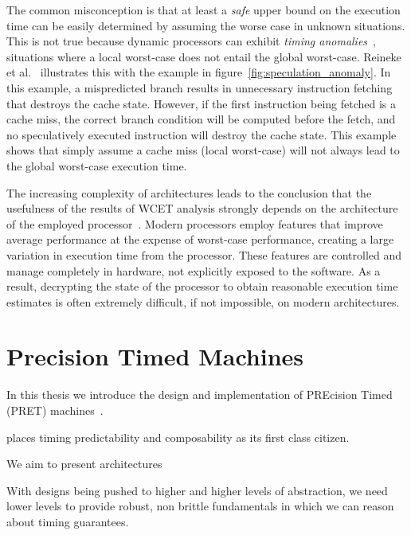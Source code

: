 The common misconception is that at least a \emph{safe} upper bound on the execution time can be easily determined by assuming the worse case in unknown situations.
This is not true because dynamic processors can exhibit \emph{timing anomalies}~\cite{Reineke06adefinition,Lundqvist1999}, situations where a local worst-case does not entail the global worst-case.
Reineke et al.~\cite{Reineke06adefinition} illustrates this with the example in figure~\ref{fig:speculation_anomaly}.
In this example, a mispredicted branch results in unnecessary instruction fetching that destroys the cache state. 
However, if the first instruction being fetched is a cache miss, the correct branch condition will be computed before the fetch, and no speculatively executed instruction will destroy the cache state. 
This example shows that simply assume a cache miss (local worst-case) will not always lead to the global worst-case execution time.    

The increasing complexity of architectures leads to the conclusion that the usefulness of the results of WCET analysis strongly depends on the architecture of the employed processor~\cite{Heckmann2003processor}.
Modern processors employ features that improve average performance at the expense of worst-case performance, creating a large variation in execution time from the processor. 
These features are controlled and manage completely in hardware, not explicitly exposed to the software.
As a result, decrypting the state of the processor to obtain reasonable execution time estimates is often extremely difficult, if not impossible, on modern architectures.   

\section{Precision Timed Machines}
In this thesis we introduce the design and implementation of PREcision Timed (PRET) machines~\cite{edwards2007case}. 

places timing predictability and composability as its first class citizen.   

We aim to present architectures

With designs being pushed to higher and higher levels of abstraction, we need lower levels to provide robust, non brittle fundamentals in which we can reason about timing guarantees.


